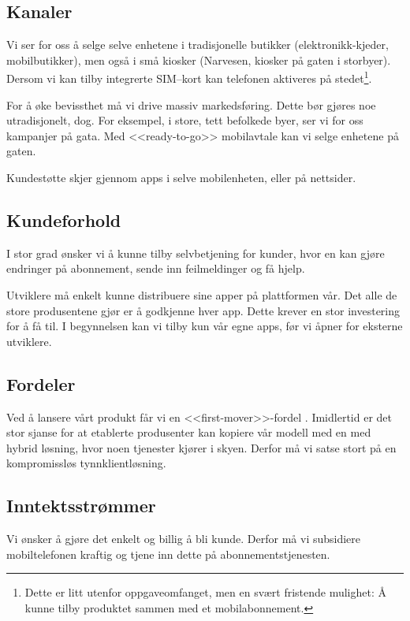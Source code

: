 \subsection{Kanaler}

Vi ser for oss å selge selve enhetene i tradisjonelle butikker
(elektronikk-kjeder, mobilbutikker), men også i små kiosker (Narvesen, kiosker
på gaten i storbyer). Dersom vi kan tilby integrerte SIM--kort kan telefonen
aktiveres på stedet\footnote{Dette er litt utenfor oppgaveomfanget, men en
svært fristende mulighet: Å kunne tilby produktet sammen med et
mobilabonnement.}.

For å øke bevissthet må vi drive massiv markedsføring. Dette bør gjøres noe
utradisjonelt, dog. For eksempel, i store, tett befolkede byer, ser vi for oss
kampanjer på gata. Med <<ready-to-go>> mobilavtale kan vi selge enhetene på
gaten.

Kundestøtte skjer gjennom apps i selve mobilenheten, eller på nettsider.

\subsection{Kundeforhold}

I stor grad ønsker vi å kunne tilby selvbetjening for kunder, hvor en kan gjøre
endringer på abonnement, sende inn feilmeldinger og få hjelp.

Utviklere må enkelt kunne distribuere sine apper på plattformen vår.  Det alle
de store produsentene gjør er å godkjenne hver app. Dette krever en stor
investering for å få til.  I begynnelsen kan vi tilby kun vår egne apps, før vi
åpner for eksterne utviklere.

\subsection{Fordeler}

Ved å lansere vårt produkt får vi en <<first-mover>>-fordel \cite{bessant}.
Imidlertid er det stor sjanse for at etablerte produsenter kan kopiere vår
modell med en med hybrid løsning, hvor noen tjenester kjører i skyen. Derfor må
vi satse stort på en kompromissløs tynnklientløsning.

\subsection{Inntektsstrømmer}

Vi ønsker å gjøre det enkelt og billig å bli kunde. Derfor må vi subsidiere
mobiltelefonen kraftig og tjene inn dette på abonnementstjenesten.

